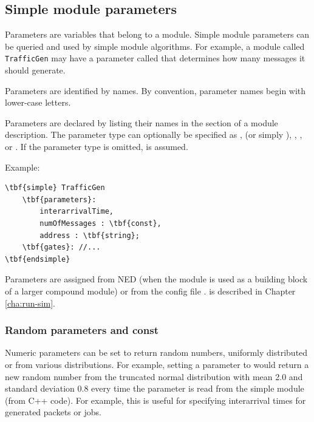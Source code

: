 \subsection{Simple module parameters}
\label{sec:ch-ned-lang:simple-module-param}


Parameters are variables that belong to a module. Simple module
parameters can be queried and used by simple module algorithms.
For example, a module called \texttt{TrafficGen} may have a parameter
called  that determines how many messages it
should generate.

Parameters are identified by names.
By convention, parameter names begin with lower-case letters.

Parameters are declared by listing their names in the
 section of a module description.
The parameter type can optionally be specified as ,
 (or simply ), , ,
or . If the parameter type is omitted,  is assumed.

Example:

\begin{Verbatim}[commandchars=\\\{\}]
\tbf{simple} TrafficGen
    \tbf{parameters}:
        interarrivalTime,
        numOfMessages : \tbf{const},
        address : \tbf{string};
    \tbf{gates}: //...
\tbf{endsimple}
\end{Verbatim}

Parameters are assigned from NED (when the module is used as a building block
of a larger compound module) or from the config file .
 is described in Chapter \ref{cha:run-sim}.


\subsubsection{Random parameters and const}
\label{sec:ch-ned-lang:const}

Numeric parameters can be set to return random numbers, uniformly
distributed or from various distributions. For example, setting a
parameter to  would return a new random number
from the truncated normal distribution with mean 2.0 and standard deviation 0.8
every time the parameter is read from the simple module (from C++ code).
For example, this is useful for specifying interarrival times for generated
packets or jobs.

